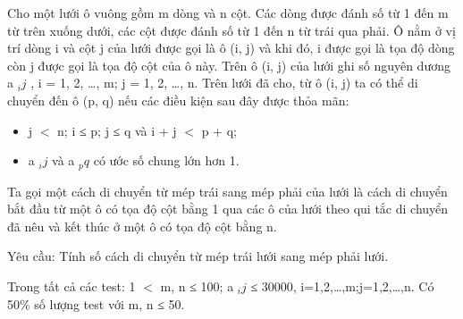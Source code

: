 Cho một lưới ô vuông gồm m dòng và n cột. Các dòng được đánh số từ 1 đến m từ trên xuống dưới, các cột được đánh số từ 1 đến n từ trái qua phải. Ô nằm ở vị trí dòng i và cột j của lưới được gọi là ô   (i, j) và khi đó, i được gọi là tọa độ dòng còn j được gọi là tọa độ cột của ô này. Trên ô (i, j) của lưới ghi số nguyên dương a   $_    ij   $   , i = 1, 2, …, m; j = 1, 2, …, n. Trên lưới đã cho, từ ô (i, j) ta có thể   di chuyển đến ô (p, q) nếu các điều kiện sau đây được thỏa mãn:  
\begin{itemize}
	\item     j $<$ n; i ≤ p; j ≤ q và i + j $<$ p + q;   
	\item     a    $_     ij    $    và a    $_     pq    $    có ước số chung lớn hơn 1.   
\end{itemize}

   Ta gọi một cách di chuyển từ mép trái sang mép phải của lưới là cách di chuyển bắt đầu từ một ô có tọa độ cột bằng 1 qua các ô của lưới theo qui tắc di chuyển đã nêu và kết thúc ở một ô có tọa độ cột   bằng n.  

   Yêu cầu: Tính số cách di chuyển từ mép trái lưới sang mép phải lưới.  

Trong tất cả các test: 1 $<$ m, n ≤ 100; a   $_    ij   $   ≤ 30000, i=1,2,…,m;j=1,2,…,n. Có 50\% số lượng test với m, n ≤ 50.
